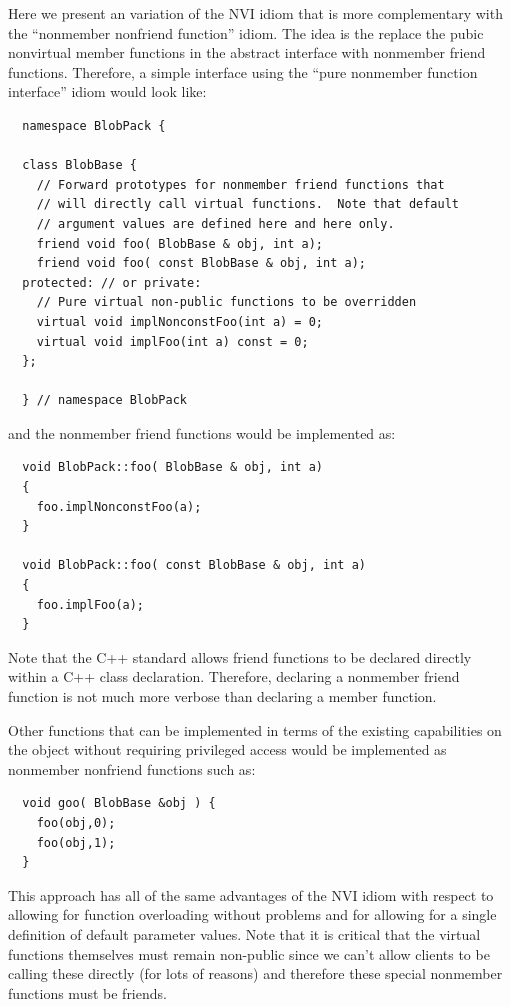 \documentclass[pdf,ps2pdf,11pt]{SANDreport}
\begin{document}
Here we present an variation of the NVI idiom that is more complementary with
the ``nonmember nonfriend function'' idiom.  The idea is the replace the pubic
nonvirtual member functions in the abstract interface with nonmember friend
functions.  Therefore, a simple interface using the ``pure nonmember function
interface'' idiom would look like:

{\small\begin{verbatim}
  namespace BlobPack {

  class BlobBase {
    // Forward prototypes for nonmember friend functions that
    // will directly call virtual functions.  Note that default
    // argument values are defined here and here only.
    friend void foo( BlobBase & obj, int a);
    friend void foo( const BlobBase & obj, int a);
  protected: // or private:
    // Pure virtual non-public functions to be overridden
    virtual void implNonconstFoo(int a) = 0;
    virtual void implFoo(int a) const = 0;
  };

  } // namespace BlobPack
\end{verbatim}}

{}\noindent{}and the nonmember friend functions would be implemented as:

{\small\begin{verbatim}
  void BlobPack::foo( BlobBase & obj, int a)
  {
    foo.implNonconstFoo(a);
  }

  void BlobPack::foo( const BlobBase & obj, int a)
  {
    foo.implFoo(a);
  }
\end{verbatim}}

Note that the C++ standard allows friend functions to be declared directly
within a C++ class declaration.  Therefore, declaring a nonmember friend
function is not much more verbose than declaring a member function.

Other functions that can be implemented in terms of the existing capabilities
on the object without requiring privileged access would be implemented as
nonmember nonfriend functions such as:

{\small\begin{verbatim}
  void goo( BlobBase &obj ) {
    foo(obj,0);
    foo(obj,1);
  }
\end{verbatim}}

This approach has all of the same advantages of the NVI idiom with respect to
allowing for function overloading without problems and for allowing
for a single definition of default parameter values.  Note that it is critical
that the virtual functions themselves must remain non-public since we can't
allow clients to be calling these directly (for lots of reasons) and therefore
these special nonmember functions must be friends.
\end{document}
